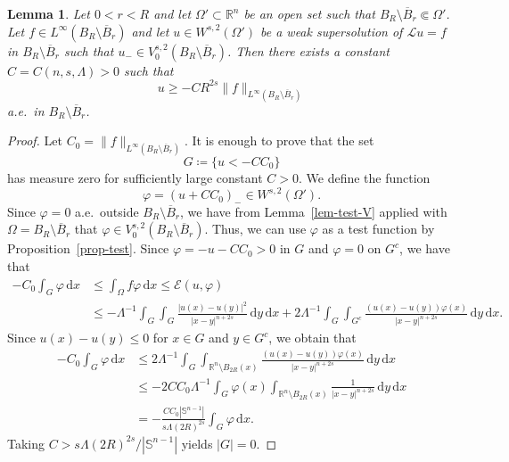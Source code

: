 \documentclass[11pt]{amsart}
\theoremstyle{plain}
\newtheorem{lemma}[theorem]{Lemma}
\theoremstyle{definition}
\numberwithin{equation}{section}
\begin{document}
\begin{lemma}\label{lem-MP-nonhom}
Let $0<r<R$ and let $\Omega' \subset \mathbb{R}^n$ be an open set such that $B_R \setminus \overline{B}_r \Subset \Omega'$. Let $f \in L^\infty(B_R \setminus \overline{B}_r)$ and let $u \in W^{s, 2}(\Omega')$ be a weak supersolution of $\mathcal{L}u=f$ in $B_R \setminus \overline{B}_r$ such that $u_- \in V^{s, 2}_0(B_R \setminus \overline{B}_r)$. Then there exists a constant $C=C(n, s, \Lambda)>0$ such that
\begin{equation*}
    u \geq -CR^{2s} \|f\|_{L^\infty(B_R \setminus \overline{B}_r)}
\end{equation*}
a.e.\ in $B_R \setminus \overline{B}_r$.
\end{lemma}

\begin{proof}
Let $C_0 = \|f\|_{L^\infty(B_R \setminus \overline{B}_r)}$. It is enough to prove that the set
\begin{equation*}
G\coloneqq\{u<-CC_0\}
\end{equation*}
has measure zero for sufficiently large constant $C>0$. We define the function
\begin{equation*}
\varphi=(u+CC_0)_-\in W^{s, 2}(\Omega').
\end{equation*}
Since $\varphi=0$ a.e.\ outside $B_R \setminus \overline{B}_r$, we have from Lemma~\ref{lem-test-V} applied with $\Omega=B_R \setminus \overline{B}_r$ that $\varphi \in V^{s, 2}_0(B_R \setminus \overline{B}_r)$. Thus, we can use $\varphi$ as a test function by Proposition~\ref{prop-test}. Since $\varphi=-u-CC_0>0$ in $G$ and $\varphi=0$ on $G^c$, we have that
\begin{align*}
-C_0 \int_G \varphi \,\mathrm{d}x
&\leq \int_\Omega f\varphi \,\mathrm{d}x \leq \mathcal{E}(u, \varphi) \\
&\leq - \Lambda^{-1}\int_G \int_G \frac{|u(x)-u(y)|^2}{|x-y|^{n+2s}} \,\mathrm{d}y \,\mathrm{d}x + 2\Lambda^{-1}\int_G \int_{G^c} \frac{(u(x)-u(y))\varphi(x)}{|x-y|^{n+2s}} \,\mathrm{d}y \,\mathrm{d}x.
\end{align*}
Since $u(x)-u(y) \leq 0$ for $x \in G$ and $y \in G^c$, we obtain that
\begin{align*}
-C_0 \int_G \varphi \,\mathrm{d}x
&\leq 2\Lambda^{-1}\int_G \int_{\mathbb{R}^n \setminus B_{2R}(x)} \frac{(u(x)-u(y))\varphi(x)}{|x-y|^{n+2s}} \,\mathrm{d}y \,\mathrm{d}x \\
&\leq -2CC_0 \Lambda^{-1} \int_G \varphi(x) \int_{\mathbb{R}^n \setminus B_{2R}(x)} \frac{1}{|x-y|^{n+2s}} \,\mathrm{d}y \,\mathrm{d}x \\
&= - \frac{CC_0 |\mathbb{S}^{n-1}|}{s \Lambda (2R)^{2s}} \int_G \varphi \,\mathrm{d}x.
\end{align*}
Taking $C>s\Lambda(2R)^{2s}/|\mathbb{S}^{n-1}|$ yields $|G|=0$.
\end{proof}
\end{document}
